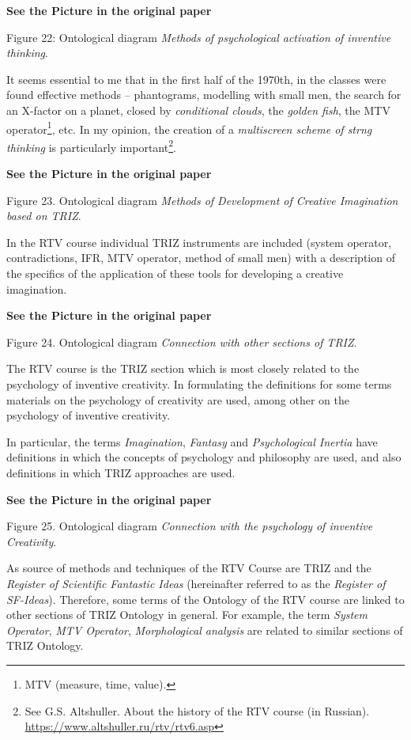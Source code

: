 \documentclass[11pt,a4paper]{article}
\newcommand{\addpicture}{\textbf{See the Picture in the original paper}\par}
\begin{document}
\begin{center}
  \addpicture
  Figure 22: Ontological diagram \emph{Methods of psychological activation
  of inventive thinking}.
\end{center}
It seems essential to me that in the first half of the 1970th, in the classes
were found effective methods -- phantograms, modelling with small men, the
search for an X-factor on a planet, closed by \emph{conditional clouds}, the
\emph{golden fish}, the MTV operator\footnote{MTV (measure, time, value).},
etc. In my opinion, the creation of a \emph{multiscreen scheme of strng
  thinking} is particularly important\footnote{See G.S. Altshuller. About the
  history of the RTV course (in Russian).
  \url{https://www.altshuller.ru/rtv/rtv6.asp}}.
\begin{center}
  \addpicture  
  Figure 23. Ontological diagram \emph{Methods of Development of Creative 
    Imagination based on TRIZ}.
\end{center}
In the RTV course individual TRIZ instruments are included (system operator,
contradictions, IFR, MTV operator, method of small men) with a description of
the specifics of the application of these tools for developing a creative
imagination.
\begin{center}
  \addpicture
  Figure 24. Ontological diagram \emph{Connection with other sections of
    TRIZ}. 
\end{center}
The RTV course is the TRIZ section which is most closely related to the
psychology of inventive creativity. In formulating the definitions for some
terms materials on the psychology of creativity are used, among other on the
psychology of inventive creativity.

In particular, the terms \emph{Imagination}, \emph{Fantasy} and
\emph{Psychological Inertia} have definitions in which the concepts of
psychology and philosophy are used, and also definitions in which TRIZ
approaches are used.

\begin{center}
  \addpicture
  Figure 25. Ontological diagram \emph{Connection with the psychology of 
    inventive Creativity}.
\end{center}
As source of methods and techniques of the RTV Course are TRIZ and the
\emph{Register of Scientific Fantastic Ideas} (hereinafter referred to as the
\emph{Register of SF-Ideas}). Therefore, some terms of the Ontology of the RTV
course are linked to other sections of TRIZ Ontology in general.  For example,
the term \emph{System Operator}, \emph{MTV Operator}, \emph{Morphological
  analysis} are related to similar sections of TRIZ Ontology.
\end{document}
